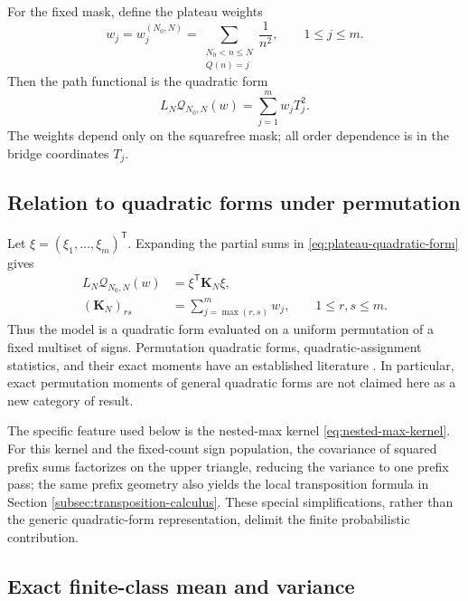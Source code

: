 \documentclass[11pt,reqno]{amsart}
\numberwithin{equation}{section}
\theoremstyle{plain}
\theoremstyle{definition}
\theoremstyle{remark}
\newcommand{\QF}{\mathcal Q}
\begin{document}
For the fixed mask, define the plateau weights
\begin{equation}
w_j=w_j^{(N_0,N)}
=\sum_{\substack{N_0<n\leq N\\Q(n)=j}}\frac{1}{n^2},
\qquad 1\leq j\leq m.
\label{eq:plateau-weights}
\end{equation}
Then the path functional is the quadratic form
\begin{equation}
L_N\QF_{N_0,N}(w)=\sum_{j=1}^{m}w_jT_j^2.
\label{eq:plateau-quadratic-form}
\end{equation}
The weights depend only on the squarefree mask; all order dependence is in
the bridge coordinates \(T_j\).

\subsection{Relation to quadratic forms under permutation}
\label{subsec:permutation-quadratic-forms}

Let \(\xi=(\xi_1,\ldots,\xi_m)^{\mathsf T}\).  Expanding the partial sums in
\eqref{eq:plateau-quadratic-form} gives
\begin{align}
L_N\QF_{N_0,N}(w)
&=\xi^{\mathsf T}\mathbf K_N\xi,
\label{eq:permutation-quadratic-form}\\
(\mathbf K_N)_{rs}
&=\sum_{j=\max(r,s)}^m w_j,
\qquad 1\leq r,s\leq m.
\label{eq:nested-max-kernel}
\end{align}
Thus the model is a quadratic form evaluated on a uniform permutation of a
fixed multiset of signs.  Permutation quadratic forms, quadratic-assignment
statistics, and their exact moments have an established literature
\cite{Hoeffding1951,HubertSchultz1976,ZhouEtAl2013}.  In particular, exact
permutation moments of general quadratic forms are not claimed here as a new
category of result.

The specific feature used below is the nested-max kernel
\eqref{eq:nested-max-kernel}.  For this kernel and the fixed-count sign
population, the covariance of squared prefix sums factorizes on the upper
triangle, reducing the variance to one prefix pass; the same prefix geometry
also yields the local transposition formula in Section
\ref{subsec:transposition-calculus}.  These special simplifications, rather
than the generic quadratic-form representation, delimit the finite
probabilistic contribution.

\subsection{Exact finite-class mean and variance}
\label{subsec:exact-mean-variance}
\end{document}
